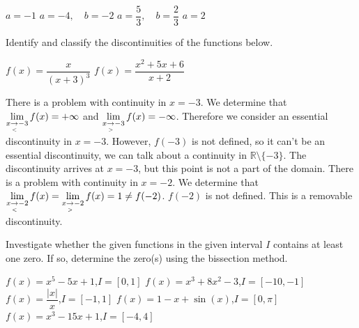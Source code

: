 \begin{Answer}\phantom{}
    \begin{multicols}{2}
    
        \Question $a=-1$
        \ifanalysis
        \Question $a=-4, \quad b=-2$
        \Question $a=\dfrac{5}{3}, \quad b=\dfrac{2}{3}$
        \fi
        \Question $a=2$
    \EndCurrentQuestion
    \end{multicols}
\end{Answer}

\begin{Exercise} Identify and classify the discontinuities of the functions below. 
\begin{multicols}{2}
    \Question[difficulty = 2] $f(x) = \dfrac{x}{(x+3)^3}$
    \Question[difficulty = 1] $f(x) = \dfrac{x^2 + 5x + 6}{x+2}$
    \EndCurrentQuestion
\end{multicols}

\end{Exercise}

\begin{Answer}\phantom{}
    
    \Question There is a problem with continuity  in $x=-3$. We determine that $\displaystyle\lim_{x\underset{<}{\rightarrow}-3} f(x) = +\infty$ and $\displaystyle\lim_{x\underset{>}{\rightarrow}-3} f(x) = -\infty$. Therefore we consider an essential discontinuity in $x=-3$. However, $f(-3)$ is not defined, so it can't be an essential discontinuity, we can talk about a continuity in $\mathbb{R} \setminus \{-3\}$. The discontinuity arrives at $x=-3$, but this point is not a part of the domain. 
    \Question There is a problem with continuity in $x=-2$. We determine that \\ $\displaystyle\lim_{x\underset{<}{\rightarrow}-2} f(x) = \displaystyle\lim_{x\underset{>}{\rightarrow}-2} f(x) = 1 \neq f(-2)$. $f(-2)$ is not defined. This is a removable discontinuity.
\end{Answer}
\fi

\begin{Exercise} Investigate whether the given functions in the given interval $I$ contains at least one zero. If so, determine the zero(s) using the bissection method. 
    \begin{multicols}{2}
    	\Question[difficulty = 1] $f(x)=x^5-5x+1$,\qquad $I=[0,1]$
    	\Question[difficulty = 1] $f(x)=x^3+8x^2-3$,\qquad $I=[-10,-1]$
    	\Question[difficulty = 1] $f(x)=\dfrac{|x|}{x}$,\qquad$I=[-1,1]$
    	\Question[difficulty = 1] $f(x)=1-x+\sin (x)$,\qquad $I=[0,\pi]$
    	\Question[difficulty = 1] $f(x) = x^3 - 15x + 1$,\qquad $I=[-4,4]$
    	\EndCurrentQuestion
    \end{multicols}

\end{Exercise}

